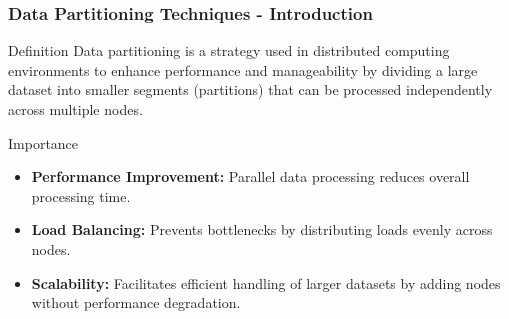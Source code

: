 \documentclass{beamer}
\begin{document}
\begin{frame}[fragile]
    \frametitle{Data Partitioning Techniques - Introduction}
    \begin{block}{Definition}
        Data partitioning is a strategy used in distributed computing environments to enhance performance and manageability by dividing a large dataset into smaller segments (partitions) that can be processed independently across multiple nodes.
    \end{block}
    
    \begin{block}{Importance}
        \begin{itemize}
            \item \textbf{Performance Improvement:} Parallel data processing reduces overall processing time.
            \item \textbf{Load Balancing:} Prevents bottlenecks by distributing loads evenly across nodes.
            \item \textbf{Scalability:} Facilitates efficient handling of larger datasets by adding nodes without performance degradation.
        \end{itemize}
    \end{block}
\end{frame}
\end{document}

